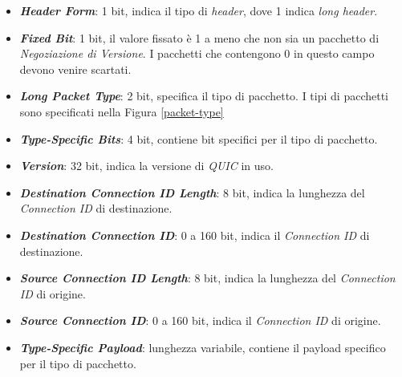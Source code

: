 \begin{itemize}
    \item \textit{\textbf{Header Form}}: 1 bit, indica il tipo di \emph{header}, dove 1 indica \emph{long header}.
    \item \textit{\textbf{Fixed Bit}}: 1 bit, il valore fissato è 1 a meno che non sia un pacchetto di \emph{Negoziazione di Versione}. I pacchetti che contengono 0 in questo campo devono venire scartati.
    \item \textit{\textbf{Long Packet Type}}: 2 bit, specifica il tipo di pacchetto. I tipi di pacchetti sono specificati nella Figura \ref{packet-type}
    \item \textit{\textbf{Type-Specific Bits}}: 4 bit, contiene bit specifici per il tipo di pacchetto.
    \item \textit{\textbf{Version}}: 32 bit, indica la versione di \emph{QUIC} in uso.
    \item \textit{\textbf{Destination Connection ID Length}}: 8 bit, indica la lunghezza del \emph{Connection ID} di destinazione.
    \item \textit{\textbf{Destination Connection ID}}: 0 a 160 bit, indica il \emph{Connection ID} di destinazione.
    \item \textit{\textbf{Source Connection ID Length}}: 8 bit, indica la lunghezza del \emph{Connection ID} di origine.
    \item \textit{\textbf{Source Connection ID}}: 0 a 160 bit, indica il \emph{Connection ID} di origine.
    \item \textit{\textbf{Type-Specific Payload}}: lunghezza variabile, contiene il payload specifico per il tipo di pacchetto.
\end{itemize}

